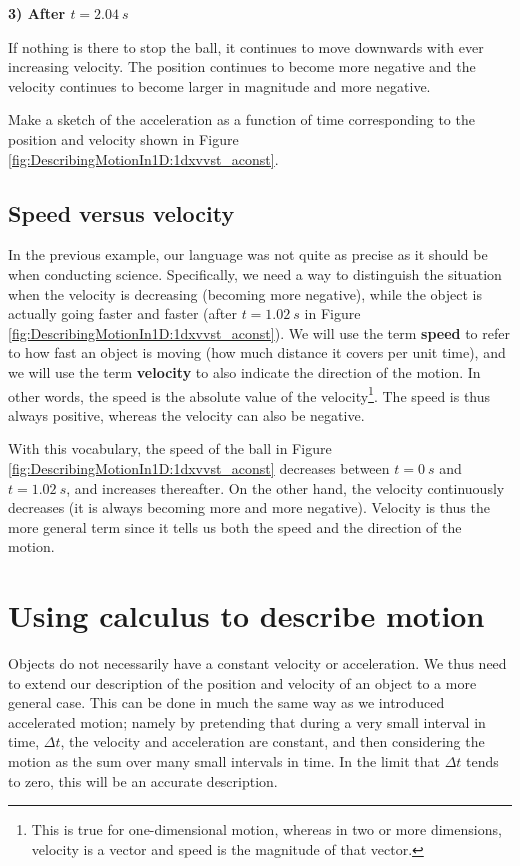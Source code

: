 \textbf{3) After $t=\SI{2.04}{s}$}

If nothing is there to stop the ball, it continues to move downwards with ever increasing velocity. The position continues to become more negative and the velocity continues to become larger in magnitude and more negative.

\begin{checkpointSA}{Make a sketch of the acceleration as a function of time corresponding to the position and velocity shown in Figure \ref{fig:DescribingMotionIn1D:1dxvvst_aconst}.}
\end{checkpointSA}

\subsection{Speed versus velocity}
In the previous example, our language was not quite as precise as it should be when conducting science. Specifically, we need a way to distinguish the situation when the velocity is decreasing (becoming more negative), while the object is actually going faster and faster (after $t=\SI{1.02}{s}$ in Figure \ref{fig:DescribingMotionIn1D:1dxvvst_aconst}). We will use the term \textbf{speed} to refer to how fast an object is moving (how much distance it covers per unit time), and we will use the term \textbf{velocity} to also indicate the direction of the motion. In other words, the speed is the absolute value of the velocity\footnote{This is true for one-dimensional motion, whereas in two or more dimensions, velocity is a vector and speed is the magnitude of that vector.}. The speed is thus always positive, whereas the velocity can also be negative.

With this vocabulary, the speed of the ball in Figure \ref{fig:DescribingMotionIn1D:1dxvvst_aconst} decreases between $t=\SI{0}{s}$ and $t=\SI{1.02}{s}$, and increases thereafter. On the other hand, the velocity continuously decreases (it is always becoming more and more negative). Velocity is thus the more general term since it tells us both the speed and the direction of the motion. 

\section{Using calculus to describe motion}
Objects do not necessarily have a constant velocity or acceleration. We thus need to extend our description of the position and velocity of an object to a more general case. This can be done in much the same way as we introduced accelerated motion; namely by pretending that during a very small interval in time, $\Delta t$, the velocity and acceleration are constant, and then considering the motion as the sum over many small intervals in time. In the limit that $\Delta t$ tends to zero, this will be an accurate description. 

